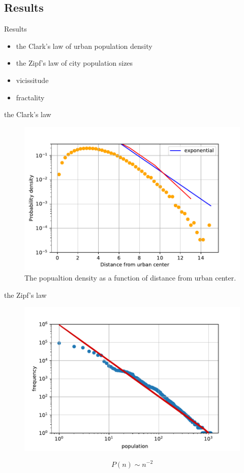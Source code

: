 \documentclass{beamer}
\begin{document}
\subsection{Results}
\begin{frame}{Results}
  \begin{itemize}
    \item the Clark's law of urban population density
    \item the Zipf's law of city population sizes
    \item vicissitude
    \item fractality
  \end{itemize}
\end{frame}

\begin{frame}{the Clark's law}
  \begin{figure}
    \includegraphics[width = 0.8\linewidth]{pics/clark.pdf}
    \caption{The popualtion density as a function of distance from urban center.}
  \end{figure}
\end{frame}

\begin{frame}{the Zipf's law}
  \begin{figure}
    \includegraphics[width = 0.8\linewidth]{pics/zipf.pdf}
  \end{figure}
  $$P(n)\sim n^{-2}$$
\end{frame}
\end{document}
